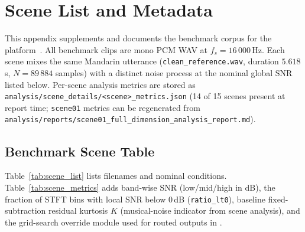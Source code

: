 \chapter{Scene List and Metadata}
\label{app:scenes}

This appendix supplements  and documents the benchmark corpus for the \projectshort{} platform~\cite{denoise_selection2026}. All benchmark clips are mono PCM WAV at $f_s=16\,000$\,Hz. Each scene mixes the same Mandarin utterance (\texttt{clean\_reference.wav}, duration $5.618$\,s, $N=89\,884$ samples) with a distinct noise process at the nominal global SNR listed below. Per-scene analysis metrics are stored as \texttt{analysis/scene\_details/<scene>\_metrics.json} (14 of 15 scenes present at report time; \texttt{scene01} metrics can be regenerated from \texttt{analysis/reports/scene01\_full\_dimension\_analysis\_report.md}).

\section{Benchmark Scene Table}
\label{app:scene_table}

Table~\ref{tab:scene_list} lists filenames and nominal conditions. Table~\ref{tab:scene_metrics} adds band-wise SNR (low/mid/high in dB), the fraction of STFT bins with local SNR below 0\,dB (\texttt{ratio\_lt0}), baseline fixed-subtraction residual kurtosis $K$ (musical-noise indicator from scene analysis), and the grid-search override module used for routed outputs in .

